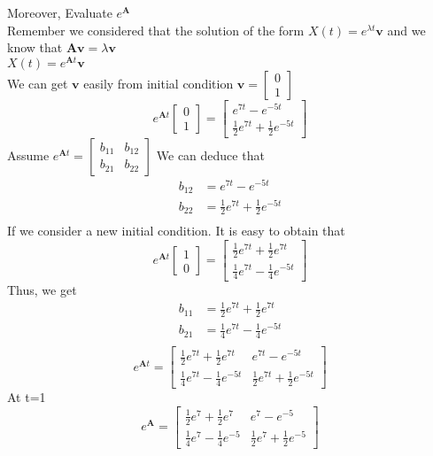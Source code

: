\documentclass[]{article}
\begin{document}
Moreover, Evaluate $e^{\mathbf{A}}$\\
Remember we considered that the solution of the form $X(t) = e^{\lambda t} \mathbf{v}$ and we know that $\mathbf{A}\mathbf{v} = \lambda \mathbf{v}$\\
$X(t) = e^{\mathbf{A} t} \mathbf{v}$\\
We can get $\mathbf{v}$ easily from initial condition $\mathbf{v} =
    \begin{bmatrix}
        0 \\
        1
    \end{bmatrix}
$
\\
$$
    e^{\mathbf{A} t}
    \begin{bmatrix}
        0 \\
        1
    \end{bmatrix}=\begin{bmatrix}
        e^{7t}   -e^{-5t} \\
        \frac{1}{2}e^{7t} + \frac{1}{2}e^{-5t}
    \end{bmatrix}
$$
Assume $ e^{\mathbf{A} t} = \begin{bmatrix}
        b_{11} & b_{12} \\
        b_{21} & b_{22}
    \end{bmatrix}
$
We can deduce that\\
\begin{align*}
    b_{12} & = e^{7t} - e^{-5t}                       \\
    b_{22} & = \frac{1}{2}e^{7t} +\frac{1}{2} e^{-5t} \\
\end{align*}
If we consider a new initial condition. It is easy to obtain that\\
$$
    e^{\mathbf{A} t}
    \begin{bmatrix}
        1 \\
        0
    \end{bmatrix}=\begin{bmatrix}
        \frac{1}{2}e^{7t} + \frac{1}{2}e^{7t} \\
        \frac{1}{4}e^{7t} - \frac{1}{4}e^{-5t}
    \end{bmatrix}
$$
Thus, we get
\begin{align*}
    b_{11} & = \frac{1}{2}e^{7t} + \frac{1}{2}e^{7t}  \\
    b_{21} & = \frac{1}{4}e^{7t} - \frac{1}{4}e^{-5t} \\
\end{align*}
$$e^{\mathbf{A}t} =
    \begin{bmatrix}
        \frac{1}{2}e^{7t} + \frac{1}{2}e^{7t}  & e^{7t} - e^{-5t}                       \\
        \frac{1}{4}e^{7t} - \frac{1}{4}e^{-5t} & \frac{1}{2}e^{7t} +\frac{1}{2} e^{-5t}
    \end{bmatrix}$$
At t=1
$$e^{\mathbf{A}} =
    \begin{bmatrix}
        \frac{1}{2}e^{7} + \frac{1}{2}e^{7}  & e^{7} - e^{-5}                       \\
        \frac{1}{4}e^{7} - \frac{1}{4}e^{-5} & \frac{1}{2}e^{7} +\frac{1}{2} e^{-5}
    \end{bmatrix}$$
\end{document}
